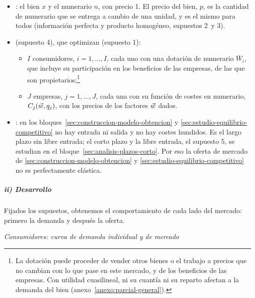 \documentclass[11pt]{article}
\begin{document}
\begin{itemize}
\item {}: el bien $x$ y el numerario $n$, con precio 1. El precio del bien, $p$, es la cantidad de numerario que se entrega a cambio de una unidad, y es el mismo para todos (información perfecta y producto homogéneo, supuestos 2~y 3).
\item {} (supuesto 4), que optimizan (supuesto 1):
  \begin{itemize}
  \item $I$ consumidores, $i=1,\dots,I$, cada uno con una dotación de numerario $\overline{W}_i$, que incluye su participación en los beneficios de las empresas, de las que son propietarios;\footnote{La dotación puede proceder de vender otros bienes o el trabajo a precios que no cambian con lo que pase en este mercado, y de los beneficios de las empresas. Con utilidad cuasilineal, ni su cuantía ni su reparto afectan a la demanda del bien (anexo~\ref{anexo:parcial-general}).}
  \item $J$ empresas, $j=1,\dots,J$, cada una con su función de costes en numerario, $C_j(\vec{w},q_j)$, con los precios de los factores $\vec{w}$ dados.
  \end{itemize}
\item {}: en los bloques~\ref{sec:construccion-modelo-obtencion} y \ref{sec:estudio-equilibrio-competitivo} no hay entrada ni salida y no hay costes hundidos. Es el largo plazo sin libre entrada; el corto plazo y la libre entrada, el supuesto 5, se estudian en el bloque~\ref{sec:analisis-plazos-corto}. Por eso la oferta de mercado de \ref{sec:construccion-modelo-obtencion} y \ref{sec:estudio-equilibrio-competitivo} no es perfectamente elástica.
\end{itemize}

\subparagraph{ii) Desarrollo}

Fijados los supuestos, obtenemos el comportamiento de cada lado del mercado: primero la demanda y después la oferta.

\hspace*{3.6em}\emph{Consumidores: curva de demanda individual y de mercado}
\end{document}
